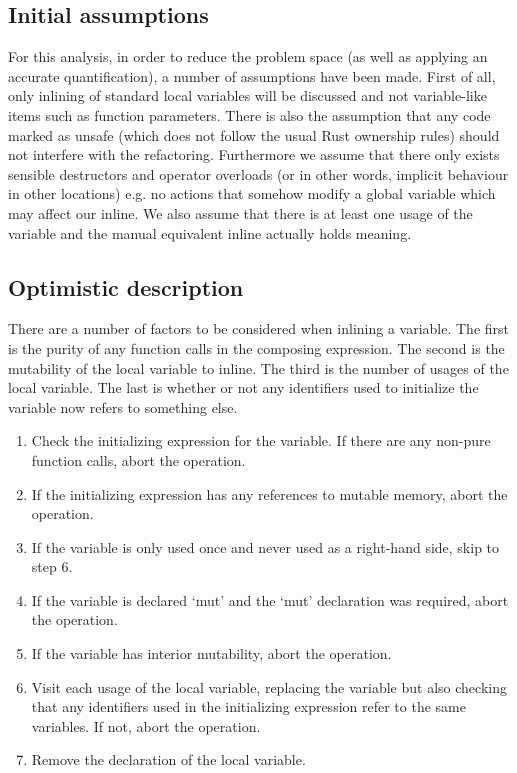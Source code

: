 \subsection{Initial assumptions}
For this analysis, in order to reduce the problem space (as well as applying an accurate quantification), a number of assumptions have been made. First of all, only inlining of standard local variables will be discussed and not variable-like items such as function parameters. There is also the assumption that any code marked as unsafe (which does not follow the usual Rust ownership rules) should not interfere with the refactoring. Furthermore we assume that there only exists sensible destructors and operator overloads (or in other words, implicit behaviour in other locations) e.g. no actions that somehow modify a global variable which may affect our inline. We also assume that there is at least one usage of the variable and the manual equivalent inline actually holds meaning.

\subsection{Optimistic description}
There are a number of factors to be considered when inlining a variable. The first is the purity of any function calls in the composing expression. The second is the mutability of the local variable to inline. The third is the number of usages of the local variable. The last is whether or not any identifiers used to initialize the variable now refers to something else.

\begin{enumerate} 
\item Check the initializing expression for the variable. If there are any non-pure function calls, abort the operation.
\item If the initializing expression has any references to mutable memory, abort the operation.
\item If the variable is only used once and never used as a right-hand side, skip to step 6.
\item If the variable is declared `mut' and the `mut' declaration was required, abort the operation.
\item If the variable has interior mutability, abort the operation.
\item Visit each usage of the local variable, replacing the variable but also checking that any identifiers used in the initializing expression refer to the same variables. If not, abort the operation.
\item Remove the declaration of the local variable.
\end{enumerate}

